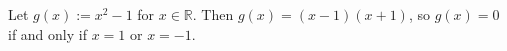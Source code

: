 Let $g(x) := x^{2} - 1$ for $x \in \mathbb{R}$.
Then $g(x) = (x - 1)(x + 1)$, so $g(x) = 0$ if and only if $x = 1$ or $x = -1$.